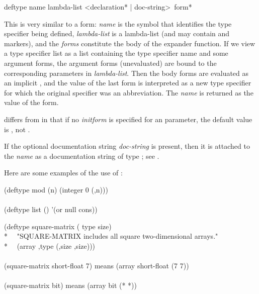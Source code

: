 \begin{defmac}
deftype name lambda-list <{declaration}* | doc-string> {\,form}*

This is very similar to a  form: \emph{name} is the
symbol that identifies the type specifier being defined, \emph{lambda-list} is
a lambda-list (and may contain  and 
markers), and
the \emph{forms} constitute the body of the expander function.  If we view a
type specifier list as a list containing the type specifier name and some argument forms,
the argument forms (unevaluated) are bound to the corresponding
parameters in \emph{lambda-list}.  Then the body forms are evaluated
as an implicit , and the value of the last form
is interpreted as a new type specifier for which the original specifier
was an abbreviation.  The \emph{name} is returned as the value of the
 form.

 differs from  in that if no \emph{initform}
is specified for an  parameter, the default value
is \cdf{*}, not {\nil}.

If the optional documentation string \emph{doc-string} is present,
then it is attached to the \emph{name}
as a documentation string of type ; see .

Here are some examples of the use of :
\begin{lisp}
(deftype mod (n) {\Xbq}(integer 0 (,n))) \\
 \\
(deftype list () '(or null cons))
\end{lisp}


\begin{lisp}
(deftype square-matrix ( type size) \\*
~~"SQUARE-MATRIX includes all square two-dimensional arrays." \\*
~~{\Xbq}(array ,type (,size ,size))) \\
 \\
(square-matrix short-float 7)  \textrm{means}  (array short-float (7 7)) \\
 \\
(square-matrix bit)  \textrm{means}  (array bit (* *))
\end{lisp}


\end{defmac}
